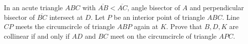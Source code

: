In an acute triangle $ABC$ with $\overline{AB} < \overline{AC}$, angle bisector of $A$ and perpendicular bisector of $\overline{BC}$ intersect at $D$. Let $P$ be an interior point of triangle $ABC$. Line $CP$ meets the circumcircle of triangle $ABP$ again at $K$. Prove that $B, D, K$ are collinear if and only if $AD$ and $BC$ meet on the circumcircle of triangle $APC$.